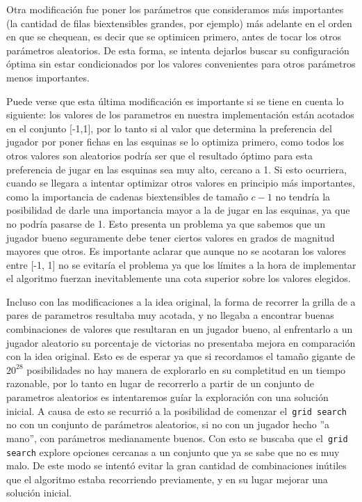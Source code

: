 \documentclass[A4paper,oneside,fleqn,11pt]{article}
\theoremstyle{definition}
\begin{document}
Otra modificación fue poner los parámetros que consideramos más importantes (la cantidad de filas biextensibles grandes, por ejemplo) más adelante en el orden en que se chequean, es decir que se optimicen primero, antes de tocar los otros parámetros aleatorios. De esta forma, se intenta dejarlos buscar su configuración óptima sin estar condicionados por los valores convenientes para otros parámetros menos importantes. 

Puede verse que esta última modificación es importante si se tiene en cuenta lo siguiente: los valores de los parametros en nuestra implementación están acotados en el conjunto [-1,1], por lo tanto si al valor que determina la preferencia del jugador por poner fichas en las esquinas se lo optimiza primero, como todos los otros valores son aleatorios podría ser que el resultado óptimo para esta preferencia de jugar en las esquinas sea muy alto, cercano a 1. Si esto ocurriera, cuando se llegara a intentar optimizar otros valores en principio más importantes, como la importancia de cadenas biextensibles de tamaño $c-1$ no tendría la posibilidad de darle una importancia mayor a la de jugar en las esquinas, ya que no podría pasarse de 1. Esto presenta un problema ya que sabemos que un jugador bueno seguramente debe tener ciertos valores en grados de magnitud mayores que otros. Es importante aclarar que aunque no se acotaran los valores entre [-1, 1] no se evitaría el problema ya que los límites a la hora de implementar el algoritmo fuerzan inevitablemente una cota superior sobre los valores elegidos.

Incluso con las modificaciones a la idea original, la forma de recorrer la grilla de a pares de parametros resultaba muy acotada, y no llegaba a encontrar buenas combinaciones de valores que resultaran en un jugador bueno, al enfrentarlo a un jugador aleatorio su porcentaje de victorias no presentaba mejora en comparación con la idea original. Esto es de esperar ya que si recordamos el tamaño gigante de $ 20^{28}$ posibilidades no hay manera de explorarlo en su completitud en un tiempo razonable, por lo tanto en lugar de recorrerlo a partir de un conjunto de parametros aleatorios es intentaremos guíar la exploración con una solución inicial. A causa de esto se recurrió a la posibilidad de comenzar el\texttt{ grid search} no con un conjunto de parámetros aleatorios, si no con un jugador hecho ''a mano'', con parámetros medianamente buenos. Con esto se buscaba que el\texttt{ grid search} explore opciones cercanas a un conjunto que ya se sabe que no es muy malo. De este modo se intentó evitar la gran cantidad de combinaciones inútiles que el algoritmo estaba recorriendo previamente, y en su lugar mejorar una solución inicial.
\end{document}
